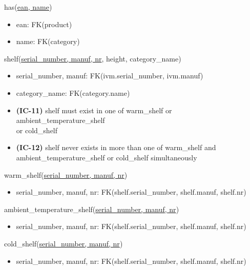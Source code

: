 \documentclass[12pt,a4paper]{article}
\begin{document}
  \vspace*{10pt}

  \noindent
  has(\underline{ean, name})
  \begin{itemize}[nosep]
    \item ean: FK(product)
    \item name: FK(category)
  \end{itemize}


  \vspace*{10pt}

  \noindent
  shelf(\underline{serial\_number, manuf, nr}, height, category\_name)
  \begin{itemize}[nosep]
    \item serial\_number, manuf: FK(ivm.serial\_number, ivm.manuf)
    \item category\_name: FK(category.name)
    \item \textsf{\textbf{(IC-11)}} shelf \textsf{must exist in one of} warm\_shelf \textsf{or} ambient\_temperature\_shelf\\ \textsf{or} cold\_shelf
    \item \textsf{\textbf{(IC-12)}} shelf \textsf{never exists in more than one of} warm\_shelf \textsf{and}\\ ambient\_temperature\_shelf \textsf{or} cold\_shelf \textsf{simultaneously}
  \end{itemize}

  \vspace*{10pt}

  \noindent
  warm\_shelf(\underline{serial\_number, manuf, nr})
  \begin{itemize}[nosep]
    \item serial\_number, manuf, nr: FK(shelf.serial\_number, shelf.manuf, shelf.nr)
  \end{itemize}

  \vspace*{10pt}

  \noindent
  ambient\_temperature\_shelf(\underline{serial\_number, manuf, nr})
  \begin{itemize}[nosep]
    \item serial\_number, manuf, nr: FK(shelf.serial\_number, shelf.manuf, shelf.nr)
  \end{itemize}

  \vspace*{10pt}

  \noindent
  cold\_shelf(\underline{serial\_number, manuf, nr})
  \begin{itemize}[nosep]
    \item serial\_number, manuf, nr: FK(shelf.serial\_number, shelf.manuf, shelf.nr)
  \end{itemize}
\end{document}
